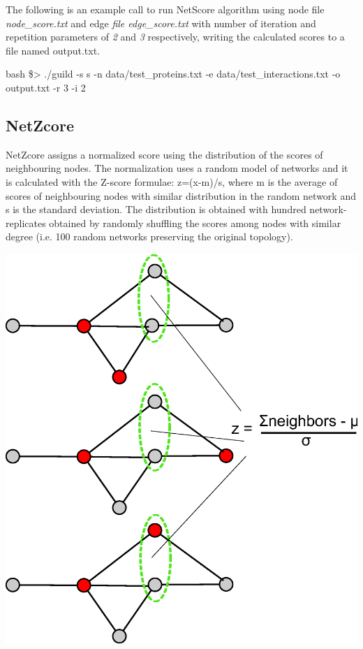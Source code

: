 \documentclass[11pt,twoside]{article}
\newcommand{\printcommand}[1]{\colorbox{code}{\scriptsize{\BUseVerbatim{#1}}}}
\begin{document}
The following is an example call to run NetScore algorithm using node file 
\textit{node\_score.txt} and edge \textit{file edge\_score.txt} with number 
of iteration and repetition parameters of \textit{2} and \textit{3} 
respectively, writing the calculated scores to a file named output.txt.

\begin{SaveVerbatim}{bash}
\$> ./guild -s s -n data/test_proteins.txt -e data/test_interactions.txt -o output.txt -r 3 -i 2
\end{SaveVerbatim}
\printcommand{bash}

\subsection{NetZcore}
NetZcore assigns a normalized score using the distribution of the scores of 
neighbouring nodes. The normalization uses a random model of networks and it 
is calculated with the Z-score formulae: z=(x-m)/s, where m is the average of 
scores of neighbouring nodes with similar distribution in the random network 
and s is the standard deviation. The distribution is obtained with hundred 
network-replicates obtained by randomly shuffling the scores among nodes with 
similar degree (i.e. 100 random networks preserving the original topology).

\includegraphics[scale=0.5]{netzcore.eps}
\end{document}

